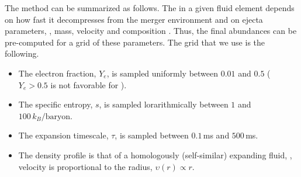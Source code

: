 The method can be summarized as follows. 
%
The \rproc{} in a given fluid element depends on how fast it decompresses from the 
merger environment and on ejecta parameters, 
\eg, mass, velocity and composition \citep{Lippuner:2015gwa}. 
Thus, the final abundances can be pre-computed for a grid of these parameters.
The grid that we use is the following.
%
%
\begin{itemize}
    \setlength\itemsep{0.1em}
    \item The electron fraction, $Y_e$, is sampled uniformly between $0.01$ and $0.5$ 
    ($Y_e>0.5$ is not favorable for \rproc{}).
    \item The specific entropy, $s$, is sampled lorarithmically 
    between $1$ and $100\, k_B/\text{baryon}$.
    \item The expansion timescale, %
    $\tau$, is sampled between $0.1\,$ms and $500\,$ms.
    \item The density profile is that of a homologously (self-similar) expanding 
    fluid, \ie, velocity is proportional to the radius, $\upsilon(r)\propto r$.
%    
%    
\end{itemize}



